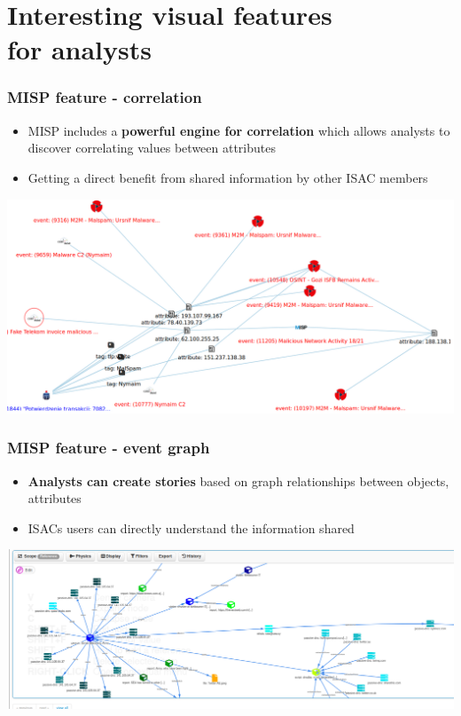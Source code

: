 \section{Interesting visual features \\ for analysts}

\begin{frame}
    \frametitle{MISP feature - correlation}
    \begin{itemize}
        \item MISP includes a \textbf{powerful engine for correlation} which allows analysts to discover correlating values between attributes
        \item Getting a direct benefit from shared information by other ISAC members
    \end{itemize}
    \includegraphics[scale=0.20]{../images/correlation.png}
\end{frame}

\begin{frame}
    \frametitle{MISP feature - event graph}
    \begin{itemize}
        \item \textbf{Analysts can create stories} based on graph relationships between objects, attributes
         \item ISACs users can directly understand the information shared
    \end{itemize}
    \includegraphics[scale=0.20]{../images/event-graph.png}
\end{frame}

